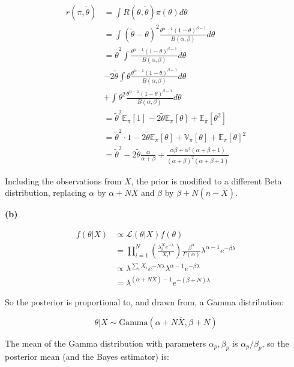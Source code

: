 \begin{align*}
r(\pi, \tilde{\theta}) 
&= \int R(\theta, \tilde{\theta}) \pi(\theta) d\theta 
\\
&= \int (\tilde{\theta} - \theta)^{2} \frac{\theta^{\alpha - 1}(1 - \theta)^{\beta - 1}}{B(\alpha, \beta)} d\theta 
\\
&= \tilde{\theta}^{2} \int \frac{\theta^{\alpha - 1}(1 - \theta)^{\beta - 1}}{B(\alpha, \beta)} d\theta
\\
&- 2 \tilde{\theta} \int \theta \frac{\theta^{\alpha - 1}(1 - \theta)^{\beta - 1}}{B(\alpha, \beta)} d\theta
\\
&+ \int \theta^{2} \frac{\theta^{\alpha - 1}(1 - \theta)^{\beta - 1}}{B(\alpha, \beta)} d\theta 
\\
&= \tilde{\theta}^{2} \mathbb{E}_\pi[1] - 2 \tilde{\theta} \mathbb{E}_\pi[\theta] + \mathbb{E}_\pi[\theta^{2}]
\\
&= \tilde{\theta}^{2} \cdot 1 - 2 \tilde{\theta} \mathbb{E}_\pi[\theta] + \mathbb{V}_\pi[\theta] + \mathbb{E}_\pi[\theta]^{2} 
\\ 
&= \tilde{\theta}^{2} - 2 \tilde{\theta} \frac{\alpha}{\alpha + \beta}
+ \frac{\alpha\beta + \alpha^{2}(\alpha + \beta + 1)}{(\alpha + \beta)^{2}(\alpha + \beta + 1)}
\end{align*}

Including the observations from \(X\), the prior is modified to a
different Beta distribution, replacing \(\alpha\) by
\(\alpha + N \overline{X}\) and \(\beta\) by
\(\beta + N(n - \overline{X})\).

\textbf{(b)}

\begin{align*}
f(\theta | X) &\propto \mathcal{L}(\theta | X) f(\theta) \\
&= \prod_{i = 1}^N \left( \frac{\lambda^X_{i} e^{-\lambda}}{X_{i}!} \right) \frac{\beta^\alpha}{\Gamma(\alpha)}\lambda^{\alpha - 1}e^{-\beta \lambda} \\
& \propto \lambda^{\sum_{i} X_{i}} e^{-N \lambda} \lambda^{\alpha - 1} e^{-\beta \lambda} \\
&= \lambda^{\left(\alpha + N \overline{X}\right) - 1} e^{-(\beta + N) \lambda}
\end{align*}

So the posterior is proportional to, and drawn from, a Gamma
distribution:

\[ \theta | X \sim \text{Gamma}\left(\alpha + N \overline{X}, \beta + N \right)\]

The mean of the Gamma distribution with parameters \(\alpha_p, \beta_p\)
is \(\alpha_p / \beta_p\), so the posterior mean (and the Bayes
estimator) is:

